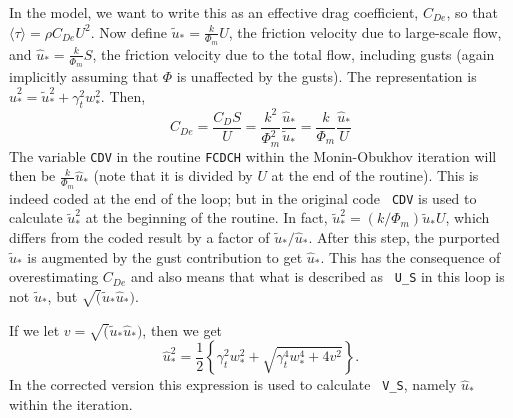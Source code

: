 \documentclass{UMDP_article}
\begin{document}
In the model, we want to write this as an effective drag coefficient,
$C_{De}$, so that $\langle\tau\rangle = \rho C_{De}U^2$. Now define
$\tilde u_* = \frac{k}{\Phi_m}U$, the friction velocity due to
large-scale flow, and $\hat u_* = \frac{k}{\Phi_m}S$, the friction
velocity due to the total flow, including gusts (again implicitly
assuming that $\Phi$ is unaffected by the gusts). The representation
is $\hat u_*^2 = \tilde u_*^2 +\gamma_t^2 w_*^2$. Then,
\begin{equation}
  C_{De}=\frac{C_DS}{U} = \frac{k^2}{\Phi_m^2} \frac{\hat u_*}{\tilde u_*}
  = \frac{k}{\Phi_m}\frac{\hat u_*}{U}
\end{equation}
The variable {\tt CDV} in the routine {\tt FCDCH} within the
Monin-Obukhov iteration will then be $\frac{k}{\Phi_m}{\hat u_*}$
(note that it is divided by $U$ at the end of the routine). This is
indeed coded at the end of the loop; but in the original code {\tt
  CDV} is used to calculate $\tilde u_*^2$ at the beginning of the
routine. In fact, $\tilde u_*^2 = (k/\Phi_m)\tilde u_* U$, which
differs from the coded result by a factor of $\tilde u_*/\hat
u_*$. After this step, the purported $\tilde u_*$ is augmented by the
gust contribution to get $\hat u_*$. This has the consequence of
overestimating $C_{De}$ and also means that what is described as {\tt
  U\_S} in this loop is not $\tilde u_*$, but $\sqrt(\tilde u_* \hat
u_*)$.

If we let $v=\sqrt(\tilde u_* \hat u_*)$, then we get
\begin{equation}
  \hat u_*^2 = \frac{1}{2} \left \{ \gamma_t^2 w_*^2 + \sqrt  { \gamma_t^4 w_*^4
      + 4 v^2 } \right \}.
\end{equation}
In the corrected version this expression is used to calculate {\tt
  V\_S}, namely $\hat u_*$ within the iteration.
\end{document}
